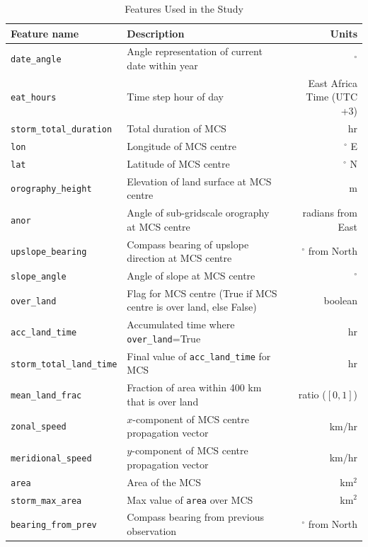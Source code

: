\begin{table}[!ht]
    \centering
    \caption{Features Used in the Study}
    \label{tab:features}
    \begin{tabular}{llr}     
        \toprule
        \textbf{Feature name} & \textbf{Description} & \textbf{Units} \\ 
        \midrule
        \texttt{date\_angle} & Angle representation of current date within year & $^\circ$ \\
        \texttt{eat\_hours} & Time step hour of day & East Africa Time (UTC +3) \\
        \texttt{storm\_total\_duration} & Total duration of MCS & hr \\
        \texttt{lon} & Longitude of MCS centre & $^\circ$ E \\
        \texttt{lat} & Latitude of MCS centre & $^\circ$ N \\
        \texttt{orography\_height} & Elevation of land surface at MCS centre & m \\
        \texttt{anor} & Angle of sub-gridscale orography at MCS centre & radians from East \\
        \texttt{upslope\_bearing} & Compass bearing of upslope direction at MCS centre & $^\circ$ from North \\
        \texttt{slope\_angle} & Angle of slope at MCS centre & $^\circ$ \\
        \texttt{over\_land} & Flag for MCS centre (True if MCS centre is over land, else False) & boolean \\
        \texttt{acc\_land\_time} & Accumulated time where \texttt{over\_land}=True & hr \\
        \texttt{storm\_total\_land\_time} & Final value of \texttt{acc\_land\_time} for MCS & hr \\
        \texttt{mean\_land\_frac} & Fraction of area within 400 km that is over land & ratio ($[0,1]$) \\
        \texttt{zonal\_speed} & $x$-component of MCS centre propagation vector & km/hr \\
        \texttt{meridional\_speed} & $y$-component of MCS centre propagation vector & km/hr \\
        \texttt{area} & Area of the MCS & km$^2$ \\
        \texttt{storm\_max\_area} & Max value of \texttt{area} over MCS & km$^2$ \\
        \texttt{bearing\_from\_prev} & Compass bearing from previous observation & $^\circ$ from North \\

\end{tabular}
\end{table}
